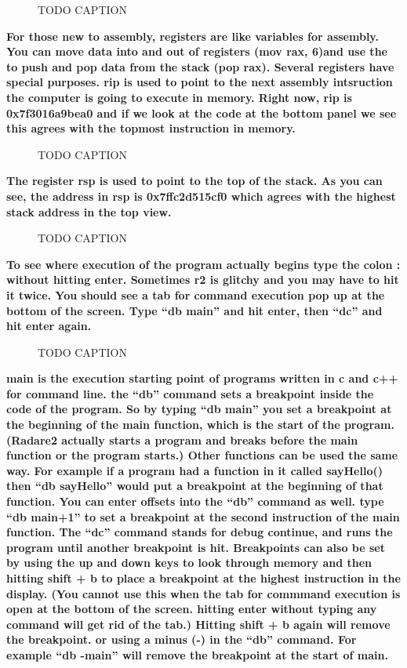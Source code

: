 \documentclass[letterpaper]{article}
\newcommand{\sitfig}[3]{
\begin{figure}[H]
\centering
\makebox[\textwidth][c]{
#2
}
\caption{#3}
\label{#1}
\end{figure}
}
\newcommand{\sitgfx}[4][scale=1.0]{
\sitfig{#3}{\texttt{[image: \#2]}}{#4}
}
\begin{document}
  
\sitgfx[width=5.8335in,height=3.6457in]{FINALWORKINGDOCFORMERLYPRECURSOR-img027.png}{fig:unk}{TODO CAPTION}
 

\textbf{For those new to assembly, registers are like variables for assembly. You can move data into and out of
registers (mov rax, 6)and use the to push and pop data from the stack (pop rax). Several registers have special
purposes. rip is used to point to the next assembly intsruction the computer is going to execute in memory. Right now,
rip is 0x7f3016a9bea0 and if we look at the code at the bottom panel we see this agrees with the topmost instruction in
memory.}

  
\sitgfx[width=5.8335in,height=3.6457in]{FINALWORKINGDOCFORMERLYPRECURSOR-img078.png}{fig:unk}{TODO CAPTION}
 

\textbf{The register rsp is used to point to the top of the stack. As you can see, the address in rsp is 0x7ffc2d515cf0
which agrees with the highest stack address in the top view.}

  
\sitgfx[width=5.8335in,height=3.6457in]{FINALWORKINGDOCFORMERLYPRECURSOR-img079.png}{fig:unk}{TODO CAPTION}
 

\textbf{To see where execution of the program actually begins type the colon : without hitting enter. Sometimes r2 is
glitchy and you may have to hit it twice. You should see a tab for command execution pop up at the bottom of the
screen. Type ``db main'' and hit enter, then ``dc'' and hit enter again.}

  
\sitgfx[width=5.8335in,height=3.6457in]{FINALWORKINGDOCFORMERLYPRECURSOR-img080.png}{fig:unk}{TODO CAPTION}
 

\textbf{main is the execution starting point of programs written in c and c++ for command line. the ``db'' command sets
a breakpoint inside the code of the program. So by typing ``db main'' you set a breakpoint at the beginning of the main
function, which is the start of the program. (Radare2 actually starts a program and breaks before the main function or
the program starts.) Other functions can be used the same way. For example if a program had a function in it called
sayHello() then ``db sayHello'' would put a breakpoint at the beginning of that function. You can enter offsets into
the ``db'' command as well. type ``db main+1'' to set a breakpoint at the second instruction of the main function. The
``dc'' command stands for debug continue, and runs the program until another breakpoint is hit. Breakpoints can also be
set by using the up and down keys to look through memory and then hitting shift + b to place a breakpoint at the
highest instruction in the display. (You cannot use this when the tab for commmand execution is open at the bottom of
the screen. hitting enter without typing any command will get rid of the tab.) Hitting shift + b again will remove the
breakpoint. or using a minus (-) in the ``db'' command. For example ``db -main'' will remove the breakpoint at the
start of main.}
\end{document}
